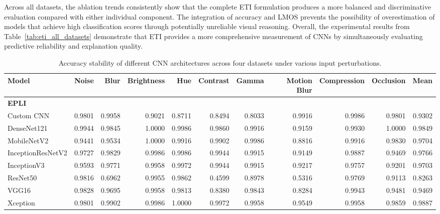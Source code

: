 \documentclass[a4paper,fleqn]{cas-dc}
\begin{document}
Across all datasets, the ablation trends consistently show that the complete ETI formulation produces a more balanced and discriminative evaluation compared with either individual component. The integration of accuracy and LMOS prevents the possibility of overestimation of models that achieve high classification scores through potentially unreliable visual reasoning. Overall, the experimental results from Table~\ref{tab:eti_all_datasets} demonstrate that ETI provides a more comprehensive measurement of CNNs by simultaneously evaluating predictive reliability and explanation quality.




\begin{table}[t]
    \centering
    \caption{Accuracy stability of different CNN architectures across four datasets under various input perturbations.}
    \label{tab:accuracy_stability_all}

    \scriptsize
    \setlength{\tabcolsep}{3pt}
    \renewcommand{\arraystretch}{1.1}

    \begin{tabular}{l *{10}{r}}
        \toprule
        \textbf{Model} &
        \textbf{Noise} &
        \textbf{Blur} &
        \textbf{Brightness} &
        \textbf{Hue} &
        \textbf{Contrast} &
        \textbf{Gamma} &
        \textbf{Motion Blur} &
        \textbf{Compression} &
        \textbf{Occlusion} &
        \textbf{Mean} \\
        \midrule

        \multicolumn{11}{l}{\textbf{EPLI}} \\
        \midrule
        Custom CNN        & 0.9801 & 0.9958 & 0.9021 & 0.8711 & 0.8494 & 0.8033 & 0.9916 & 0.9986 & 0.9801 & 0.9302 \\
        DenseNet121       & 0.9944 & 0.9845 & 1.0000 & 0.9986 & 0.9860 & 0.9916 & 0.9159 & 0.9930 & 1.0000 & 0.9849 \\
        MobileNetV2       & 0.9441 & 0.9534 & 1.0000 & 0.9916 & 0.9902 & 0.9986 & 0.8816 & 0.9916 & 0.9830 & 0.9704 \\
        InceptionResNetV2 & 0.9727 & 0.9829 & 0.9986 & 0.9986 & 0.9944 & 0.9915 & 0.9149 & 0.9887 & 0.9469 & 0.9766 \\
        InceptionV3       & 0.9593 & 0.9771 & 0.9958 & 0.9972 & 0.9944 & 0.9915 & 0.9217 & 0.9757 & 0.9201 & 0.9703 \\
        ResNet50          & 0.9816 & 0.6962 & 0.9955 & 0.9862 & 0.4599 & 0.8978 & 0.5316 & 0.9769 & 0.9113 & 0.8263 \\
        VGG16             & 0.9828 & 0.9695 & 0.9958 & 0.9813 & 0.8380 & 0.9843 & 0.8284 & 0.9943 & 0.9481 & 0.9469 \\
        Xception          & 0.9801 & 0.9902 & 0.9986 & 1.0000 & 0.9972 & 0.9958 & 0.9549 & 0.9958 & 0.9859 & 0.9887 \\


\end{tabular}
\end{table}
\end{document}
